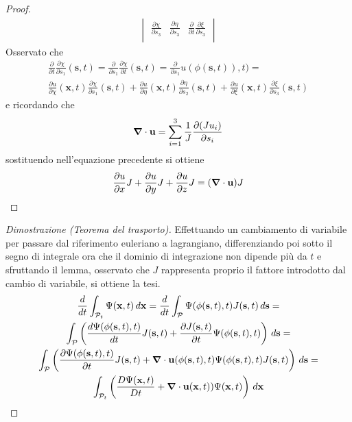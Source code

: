 \begin{proof}
\begin{multline*}
\begin{vmatrix}
\frac{\partial \chi}{\partial s_3} & \frac{\partial \eta}{\partial s_3} & \frac{\partial}{\partial t}\frac{\partial \xi}{\partial s_3} \\
\end{vmatrix}
\end{multline*}
Osservato che
\begin{multline*}
\frac{\partial}{\partial t}\frac{\partial \chi}{\partial s_1}(\mathbf{s},t) =
\frac{\partial}{\partial s_1}\frac{\partial \chi}{\partial t}(\mathbf{s},t) = 
\frac{\partial}{\partial s_1}u(\phi(\mathbf{s},t)),t) = \\ 
\frac{\partial u}{\partial \chi}(\mathbf{x},t)\frac{\partial\chi}{\partial s_1}(\mathbf{s},t)
+ \frac{\partial u}{\partial \eta}(\mathbf{x},t)\frac{\partial\eta}{\partial s_2}(\mathbf{s},t)
+ \frac{\partial u}{\partial \xi}(\mathbf{x},t)\frac{\partial\xi}{\partial s_3}(\mathbf{s},t)
\end{multline*}
e ricordando che
\begin{equation*}%
\Nabla\cdot\mathbf{u} = \sum_{i=1}^{3}{\frac{1}{J}\frac{\partial(Ju_i) }{\partial s_i}}
\end{equation*}
sostituendo nell'equazione precedente si ottiene
\begin{equation*}
\frac{\partial u}{\partial x} J + \frac{\partial u}{\partial y} J +\frac{\partial u}{\partial z} J = (\boldsymbol{\nabla} \cdot \mathbf{u}) J
\end{equation*}
\end{proof}
\begin{proof}[Dimostrazione (Teorema del trasporto)]
Effettuando un cambiamento di variabile per passare dal riferimento euleriano a lagrangiano, differenziando poi sotto il segno di integrale ora che il dominio di integrazione non dipende più da $t$ e sfruttando il lemma, osservato che $J$ rappresenta proprio il fattore introdotto dal cambio di variabile, si ottiene la tesi.
\begin{multline*}
\frac{d}{dt}\int_{\mathcal{P}_{t}}\Psi(\mathbf{x},t)\,d\mathbf{x} =
\frac{d}{dt}\int_{\mathcal{P}}\Psi(\phi(\mathbf{s},t),t)J(\mathbf{s},t)\,d\mathbf{s} = \\
\int_{\mathcal{P}}\left(\frac{d\Psi(\phi(\mathbf{s},t),t)}{d t}J(\mathbf{s},t)+\frac{\partial  J(\mathbf{s},t)}{\partial t}\Psi(\phi(\mathbf{s},t),t)\right)\,d\mathbf{s} = \\
\int_{\mathcal{P}}\left(\frac{\partial\Psi(\phi(\mathbf{s},t),t)}{\partial t}J(\mathbf{s},t)+\boldsymbol{\nabla}\cdot\mathbf{u}(\phi(\mathbf{s},t),t)\Psi(\phi(\mathbf{s},t),t) J(\mathbf{s},t)\right)\,d\mathbf{s} = \\
\int_{\mathcal{P}_t}\left(\frac{D\Psi(\mathbf{x},t)}{D t}+\boldsymbol{\nabla}\cdot\mathbf{u}(\mathbf{x},t))\Psi(\mathbf{x},t)\right)\,d\mathbf{x} 
\end{multline*}
\end{proof}


